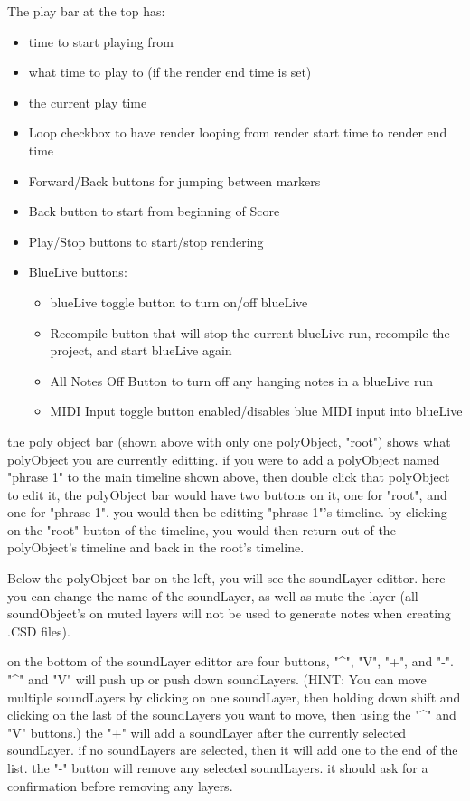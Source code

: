 The play bar at the top has:

\begin{itemize}
\tightlist
\item
  time to start playing from
\item
  what time to play to (if the render end time is set)
\item
  the current play time
\item
  Loop checkbox to have render looping from render start time to render
  end time
\item
  Forward/Back buttons for jumping between markers
\item
  Back button to start from beginning of Score
\item
  Play/Stop buttons to start/stop rendering
\item
  BlueLive buttons:

  \begin{itemize}
  \tightlist
  \item
    blueLive toggle button to turn on/off blueLive
  \item
    Recompile button that will stop the current blueLive run, recompile
    the project, and start blueLive again
  \item
    All Notes Off Button to turn off any hanging notes in a blueLive run
  \item
    MIDI Input toggle button enabled/disables blue MIDI input into
    blueLive
  \end{itemize}
\end{itemize}

the poly object bar (shown above with only one polyObject, "root") shows
what polyObject you are currently editting. if you were to add a
polyObject named "phrase 1" to the main timeline shown above, then
double click that polyObject to edit it, the polyObject bar would have
two buttons on it, one for "root", and one for "phrase 1". you would
then be editting "phrase 1"'s timeline. by clicking on the "root" button
of the timeline, you would then return out of the polyObject's timeline
and back in the root's timeline.

Below the polyObject bar on the left, you will see the soundLayer
edittor. here you can change the name of the soundLayer, as well as mute
the layer (all soundObject's on muted layers will not be used to
generate notes when creating .CSD files).

on the bottom of the soundLayer edittor are four buttons, "\^{}", "V",
"+", and "-". "\^{}" and "V" will push up or push down soundLayers.
(HINT: You can move multiple soundLayers by clicking on one soundLayer,
then holding down shift and clicking on the last of the soundLayers you
want to move, then using the "\^{}" and "V" buttons.) the "+" will add a
soundLayer after the currently selected soundLayer. if no soundLayers
are selected, then it will add one to the end of the list. the "-"
button will remove any selected soundLayers. it should ask for a
confirmation before removing any layers.

